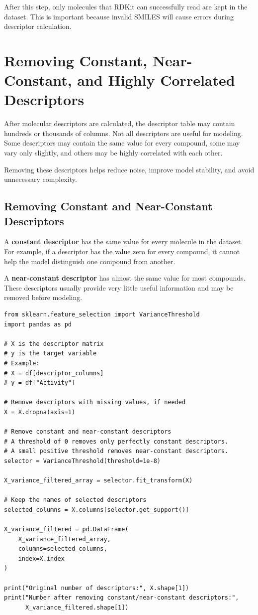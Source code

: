 \documentclass[11pt]{report}
\newenvironment{Important note}{\begin{quote}\color{red}\textbf{Important note:} }{\end{quote}}
\begin{document}
After this step, only molecules that RDKit can successfully read are kept in the dataset. This is important because invalid SMILES will cause errors during descriptor calculation.



\section{Removing Constant, Near-Constant, and Highly Correlated Descriptors}

After molecular descriptors are calculated, the descriptor table may contain hundreds or thousands of columns. Not all descriptors are useful for modeling. Some descriptors may contain the same value for every compound, some may vary only slightly, and others may be highly correlated with each other.

Removing these descriptors helps reduce noise, improve model stability, and avoid unnecessary complexity.

\subsection{Removing Constant and Near-Constant Descriptors}

A \textbf{constant descriptor} has the same value for every molecule in the dataset. For example, if a descriptor has the value zero for every compound, it cannot help the model distinguish one compound from another.

A \textbf{near-constant descriptor} has almost the same value for most compounds. These descriptors usually provide very little useful information and may be removed before modeling.

\begin{lstlisting}[style=pythonstyle, caption={Removing constant and near-constant descriptors.}]
from sklearn.feature_selection import VarianceThreshold
import pandas as pd

# X is the descriptor matrix
# y is the target variable
# Example:
# X = df[descriptor_columns]
# y = df["Activity"]

# Remove descriptors with missing values, if needed
X = X.dropna(axis=1)

# Remove constant and near-constant descriptors
# A threshold of 0 removes only perfectly constant descriptors.
# A small positive threshold removes near-constant descriptors.
selector = VarianceThreshold(threshold=1e-8)

X_variance_filtered_array = selector.fit_transform(X)

# Keep the names of selected descriptors
selected_columns = X.columns[selector.get_support()]

X_variance_filtered = pd.DataFrame(
    X_variance_filtered_array,
    columns=selected_columns,
    index=X.index
)

print("Original number of descriptors:", X.shape[1])
print("Number after removing constant/near-constant descriptors:",
      X_variance_filtered.shape[1])
\end{lstlisting}
\end{document}
